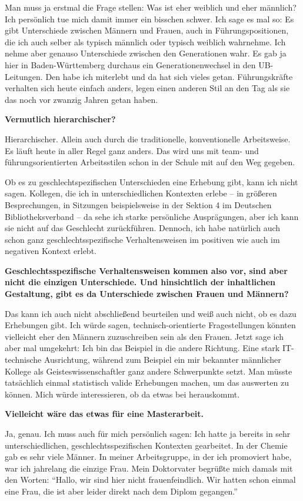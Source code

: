 \documentclass[a4paper,
fontsize=11pt,
oneside,
numbers=noperiodatend,
parskip=half-,
bibliography=totoc,
final
]{scrartcl}
\begin{document}
Man muss ja erstmal die Frage stellen: Was ist eher weiblich und eher
männlich? Ich persönlich tue mich damit immer ein bisschen schwer. Ich
sage es mal so: Es gibt Unterschiede zwischen Männern und Frauen, auch
in Füh\-rungs\-po\-si\-tionen, die ich auch selber als typisch männlich oder
typisch weiblich wahrnehme. Ich nehme aber genauso Unterschiede zwischen
den Generationen wahr. Es gab ja hier in Baden-Württemberg durchaus ein
Generationenwechsel in den UB-Leitungen. Den habe ich miterlebt und da
hat sich vieles getan. Führungskräfte verhalten sich heute einfach
anders, legen einen anderen Stil an den Tag als sie das noch vor zwanzig
Jahren getan haben.

\textbf{Vermutlich hierarchischer?}

Hierarchischer. Allein auch durch die traditionelle, konventionelle
Arbeitsweise. Es läuft heute in aller Regel ganz anders. Das wird uns
mit team- und führungsorientierten Arbeitsstilen schon in der Schule mit
auf den Weg gegeben.

Ob es zu geschlechtspezifischen Unterschieden eine Erhebung gibt, kann
ich nicht sagen. Kollegen, die ich in unterschiedlichen Kontexten erlebe
-- in größeren Besprechungen, in Sitzungen beispielsweise in der Sektion
4 im Deutschen Bibliotheksverband -- da sehe ich starke persönliche
Ausprägungen, aber ich kann sie nicht auf das Geschlecht zurückführen.
Dennoch, ich habe natürlich auch schon ganz geschlechtsspezifische
Verhaltensweisen im positiven wie auch im negativen Kontext erlebt.

\textbf{Geschlechtsspezifische Verhaltensweisen kommen also vor, sind
aber nicht die einzigen Unterschiede. Und hinsichtlich der inhaltlichen
Gestaltung, gibt es da Unterschiede zwischen Frauen und Männern?}

Das kann ich auch nicht abschließend beurteilen und weiß auch nicht, ob
es dazu Erhebungen gibt. Ich würde sagen, technisch-orientierte
Fragestellungen könnten vielleicht eher den Männern zuzuschreiben sein
als den Frauen. Jetzt sage ich aber mal umgekehrt: Ich bin das Beispiel
in die andere Richtung. Eine stark IT-technische Ausrichtung, während
zum Beispiel ein mir bekannter männlicher Kollege als
Geisteswissenschaftler ganz andere Schwerpunkte setzt. Man müsste
tatsächlich einmal statistisch valide Erhebungen machen, um das
auswerten zu können. Mich würde interessieren, ob da etwas bei
herauskommt.

\textbf{Vielleicht wäre das etwas für eine Masterarbeit.}

Ja, genau. Ich muss auch für mich persönlich sagen: Ich hatte ja bereits
in sehr unterschiedlichen, geschlechtsspezifischen Kontexten gearbeitet.
In der Chemie gab es sehr viele Männer. In meiner Arbeitsgruppe, in der
ich promoviert habe, war ich jahrelang die einzige Frau. Mein
Doktorvater begrüßte mich damals mit den Worten: \enquote{Hallo, wir
sind hier nicht frauenfeindlich. Wir hatten schon einmal eine Frau, die
ist aber leider direkt nach dem Diplom gegangen.}
\end{document}
